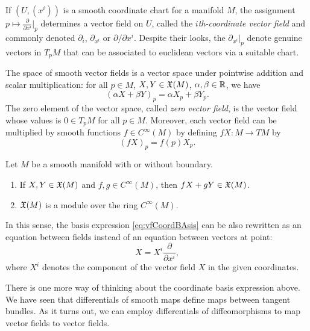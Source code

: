 \begin{example}
  If $(U, (x^i))$ is a smooth coordinate chart for a manifold $M$, the assignment $p \mapsto \frac{\partial}{\partial x^i}\big|_p$ determines a vector field on $U$, called the \emph{$i$th-coordinate vector field} and commonly denoted $\partial_{i}$, $\partial_{x^i}$ or $\partial/\partial x^i$.
  Despite their looks, the $\partial_{x^i}|_p$ denote genuine vectors in $T_p M$ that can be associated to euclidean vectors via a suitable chart.
\end{example}

The space of smooth vector fields is a vector space under pointwise addition and scalar multiplication: for all $p\in M$, $X,Y\in\mathfrak{X}(M)$, $\alpha, \beta \in \mathbb{R}$, we have
\begin{equation}
  (\alpha X + \beta Y)_p = \alpha X_p + \beta Y_p.
\end{equation}
The zero element of the vector space, called \emph{zero vector field}, is the vector field whose values is $0\in T_pM$ for all $p\in M$.
Moreover, each vector field can be multiplied by smooth functions $f\in C^\infty(M)$ by defining $fX:M\to  TM$ by
\begin{equation}
  (fX)_p = f(p)X_p.
\end{equation}

\begin{proposition}
  Let $M$ be a smooth manifold with or without boundary.
  \begin{enumerate}
    \item If $X,Y \in \mathfrak{X}(M)$ and $f,g\in C^\infty(M)$, then $fX+gY \in\mathfrak{X}(M)$.
    \item $\mathfrak{X}(M)$ is a module over the ring $C^\infty(M)$.
  \end{enumerate}
\end{proposition}

In this sense, the basis expression \eqref{eq:vfCoordBAsis} can be also rewritten as an equation between fields instead of an equation between vectors at point:
\begin{equation}\label{eq:vfCoordBAsis}
  X = X^i \frac{\partial}{\partial x^i},
\end{equation}
where $X^i$ denotes the component of the vector field $X$ in the given coordinates.

There is one more way of thinking about the coordinate basis expression above.
We have seen that differentials of smooth maps define maps between tangent bundles.
As it turns out, we can employ differentials of diffeomorphisms to map vector fields to vector fields.

